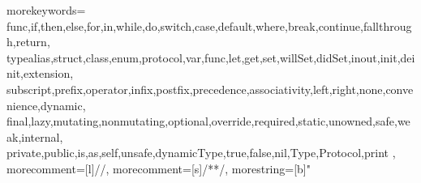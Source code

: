 
\usepackage{amssymb,amsmath,verbatim,graphicx,pdfpages,microtype,units,booktabs,upquote,xcolor,siunitx,csquotes,fancyvrb,newverbs,wrapfig,multicol,tikz,textcomp,wrapfig,cutwin}
\usepackage{fontawesome,setspace,rotchiffre,lipsum,listings,animate,listings}
\usepackage[xspace]{ellipsis}


\hypersetup{%
            colorlinks = true,
            linkcolor = orange,
            urlcolor  = orange,
            citecolor = orange,
            anchorcolor = orange}

\newcommand{\hugeslide}[1]{%
\begin{frame}[plain,c]
    \centering {\usebeamerfont*{frametitle} \usebeamercolor[fg]{frametitle}{\fontsize{40}{50}\selectfont\textit{#1}}}
\end{frame}
}

\newcommand{\presentby}[2]{%
    \note{%
        \topskip0pt
        \vspace*{\fill}
        \huge \textbf{#1, \textit{#2} Minute(s)}
        \vspace*{\fill}
    }
}

\newcommand{\presentaddcount}[1]{\addtocounter{#1}{1}\Roman{#1}}
\newcommand{\presentcount}[1]{\Roman{#1}}
\newcommand{\shellcmd}[1]{\texttt{\colorbox{gray!30}{#1}}}

{%
  morekeywords={%
    func,if,then,else,for,in,while,do,switch,case,default,where,break,continue,fallthrough,return,
    typealias,struct,class,enum,protocol,var,func,let,get,set,willSet,didSet,inout,init,deinit,extension,
    subscript,prefix,operator,infix,postfix,precedence,associativity,left,right,none,convenience,dynamic,
    final,lazy,mutating,nonmutating,optional,override,required,static,unowned,safe,weak,internal,
    private,public,is,as,self,unsafe,dynamicType,true,false,nil,Type,Protocol,print
  },
  morecomment=[l]{//}, %
  morecomment=[s]{/*}{*/}, %
  morestring=[b]" %
}



\newcommand\syntaxbox[2][fill=orange!80]{%
    \tikz[baseline]\node[%
        inner ysep=0pt,
        inner xsep=2pt,
        anchor=text,
        rectangle,
        rounded corners=1mm,
        #1] {\strut#2};%
}


